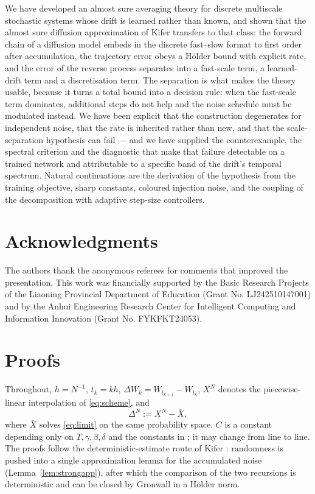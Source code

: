 \documentclass[a4paper,fleqn]{cas-dc}
\theoremstyle{definition}
\begin{document}
We have developed an almost sure averaging theory for discrete multiscale stochastic
systems whose drift is learned rather than known, and shown that the almost sure
diffusion approximation of Kifer \cite{kifer2025} transfers to that class: the forward chain of
a diffusion model embeds in the discrete fast--slow format to first order after
accumulation, the trajectory error obeys a H\"older bound with explicit rate, and the
error of the reverse process separates into a fast-scale term, a learned-drift term and
a discretisation term. The separation is what makes the theory usable, because it turns
a total bound into a decision rule: when the fast-scale term dominates, additional
steps do not help and the noise schedule must be modulated instead. We have been
explicit that the construction degenerates for independent noise, that the rate is
inherited rather than new, and that the scale-separation hypothesis can fail --- and we
have supplied the counterexample, the spectral criterion and the diagnostic that make
that failure detectable on a trained network and attributable to a specific band of the
drift's temporal spectrum. Natural continuations are the derivation of the hypothesis from
the training objective, sharp constants, coloured injection noise, and the coupling of
the decomposition with adaptive step-size controllers.

\section*{Acknowledgments}
The authors thank the anonymous referees for comments that improved the
presentation. This work was financially supported by the Basic Research Projects of
the Liaoning Provincial Department of Education (Grant No. LJ242510147001) and by
the Anhui Engineering Research Center for Intelligent Computing and Information
Innovation (Grant No. FYKFKT24053).

\appendix
\section{Proofs}
\label{app:proofs}
\setcounter{equation}{0}
\renewcommand{\theequation}{A.\arabic{equation}}

Throughout, $h=N^{-1}$, $t_{k}=kh$, $\Delta W_{k}=W_{t_{k+1}}-W_{t_{k}}$,
$X^{N}$ denotes the piecewise-linear interpolation of \eqref{eq:scheme}, and
\begin{equation}
\Delta^{N}:=X^{N}-\bar X,
\label{eq:Delta}
\end{equation}
where $\bar X$ solves \eqref{eq:limit} on the same probability space.
$C$ is a constant depending only on $T,\gamma,\beta,\delta$ and the constants in
; it may change from line to line. The proofs follow the
deterministic-estimate route of Kifer \cite{kifer2025}: randomness is pushed into a single
approximation lemma for the accumulated noise (Lemma~\ref{lem:strongapp}), after which the
comparison of the two recursions is deterministic and can be closed by Gronwall in a
H\"older norm.
\end{document}
